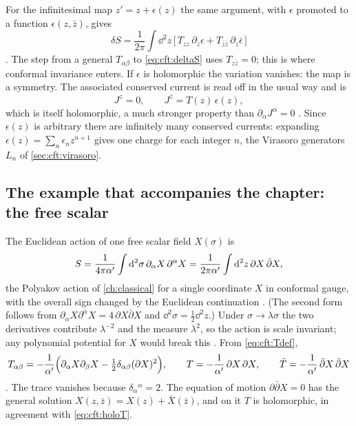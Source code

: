 For the infinitesimal map $z'=z+\epsilon(z)$ the same argument, with $\epsilon$ promoted to a
function $\epsilon(z,\bar z)$, gives
\begin{equation}\label{eq:cft:deltaS}
  \delta S=\frac{1}{2\pi}\int\dd^2z\,\big[\,T_{zz}\,\partial_{\bar z}\epsilon
    +T_{\bar z\bar z}\,\partial_z\bar\epsilon\,\big]
\end{equation}
. The step from a general $T_{\alpha\beta}$ to
\eqref{eq:cft:deltaS} uses $T_{z\bar z}=0$; this is where conformal invariance enters. If
$\epsilon$ is holomorphic the variation vanishes: the map is a symmetry. The associated
conserved current is read off in the usual way and is
\begin{equation}\label{eq:cft:current}
  J^{z}=0,\qquad J^{\bar z}=T(z)\,\epsilon(z),
\end{equation}
which is itself holomorphic, a much stronger property than $\partial_\alpha J^\alpha=0$
. Since $\epsilon(z)$ is arbitrary there are infinitely many
conserved currents: expanding $\epsilon(z)=\sum_n\epsilon_nz^{n+1}$ gives one charge for each
integer $n$, the Virasoro generators $L_n$ of \cref{sec:cft:virasoro}.

\subsection{The example that accompanies the chapter: the free scalar}

The Euclidean action of one free scalar field $X(\sigma)$ is
\begin{equation}\label{eq:cft:freeaction}
  S=\frac{1}{4\pi\alpha'}\int\mathrm{d}^2\sigma\,\partial_\alpha X\,\partial^\alpha X
   =\frac{1}{2\pi\alpha'}\int\mathrm{d}^2z\,\partial X\,\bar\partial X ,
\end{equation}
the Polyakov action of \cref{ch:classical} for a single coordinate $X$ in conformal gauge, with
the overall sign changed by the Euclidean continuation .
(The second form follows from $\partial_\alpha X\partial^\alpha X=4\,\partial X\bar\partial X$ and
$\dd^2\sigma=\tfrac12\dd^2z$.) Under $\sigma\to\lambda\sigma$ the two derivatives contribute
$\lambda^{-2}$ and the measure $\lambda^{2}$, so the action is scale invariant; any polynomial
potential for $X$ would break this . From
\eqref{eq:cft:Tdef},
\begin{equation}\label{eq:cft:Tfree}
  T_{\alpha\beta}=-\frac{1}{\alpha'}\Big(\partial_\alpha X\partial_\beta X
    -\tfrac12\delta_{\alpha\beta}(\partial X)^2\Big),\qquad
  T=-\frac1{\alpha'}\,\partial X\,\partial X,\qquad
  \bar T=-\frac1{\alpha'}\,\bar\partial X\,\bar\partial X
\end{equation}
. The trace vanishes because $\delta_{\alpha}{}^{\alpha}=2$.
The equation of motion $\partial\bar\partial X=0$ has the general solution
$X(z,\bar z)=X(z)+\bar X(\bar z)$, and on it $T$ is holomorphic, in agreement with
\eqref{eq:cft:holoT}.

